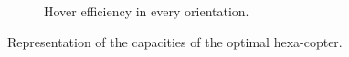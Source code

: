 \begin{figure}[!h]
{\begin{subfigure}[b]{0.45\textwidth}
    \caption{Hover efficiency in every orientation.} \label{fig:hexa_hspace}
  \end{subfigure}}
  \caption{Representation of the capacities of the optimal hexa-copter.}
  \label{fig:Hexacopter_spaces}
\end{figure}

\begin{figure}[!h]
\end{figure}
